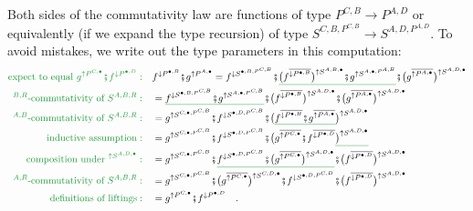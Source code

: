 Both sides of the commutativity law are functions of type $P^{C,B}\rightarrow P^{A,D}$
or equivalently (if we expand the type recursion) of type $S^{C,B,P^{C,B}}\rightarrow S^{A,D,P^{A,D}}$.
To avoid mistakes, we write out the type parameters in this computation:
\begin{align*}
{\color{greenunder}\text{expect to equal }g^{\uparrow P^{C,\bullet}}\bef f^{\downarrow P^{\bullet,D}}:}\quad & f^{\downarrow P^{\bullet,B}}\bef g^{\uparrow P^{A,\bullet}}=f^{\downarrow S^{\bullet,B,P^{C,B}}}\bef\gunderline{\big(f^{\overline{\downarrow P^{\bullet,B}}}\big)^{\uparrow S^{A,B,\bullet}}\bef g^{\uparrow S^{A,\bullet,P^{A,B}}}}\bef\big(g^{\overline{\uparrow P^{A,\bullet}}}\big)^{\uparrow S^{A,D,\bullet}}\\
{\color{greenunder}^{B,R}\text{-commutativity of }S^{A,B,R}:}\quad & =\gunderline{f^{\downarrow S^{\bullet,B,P^{C,B}}}\bef g^{\uparrow S^{A,\bullet,P^{C,B}}}}\bef\big(f^{\overline{\downarrow P^{\bullet,B}}}\big)^{\uparrow S^{A,D,\bullet}}\bef\big(g^{\overline{\uparrow P^{A,\bullet}}}\big)^{\uparrow S^{A,D,\bullet}}\\
{\color{greenunder}^{A,B}\text{-commutativity of }S^{A,B,R}:}\quad & =g^{\uparrow S^{C,\bullet,P^{C,B}}}\bef f^{\downarrow S^{\bullet,D,P^{C,B}}}\bef\big(\gunderline{f^{\overline{\downarrow P^{\bullet,B}}}\bef g^{\overline{\uparrow P^{A,\bullet}}}}\big)^{\uparrow S^{A,D,\bullet}}\\
{\color{greenunder}\text{inductive assumption}:}\quad & =g^{\uparrow S^{C,\bullet,P^{C,B}}}\bef f^{\downarrow S^{\bullet,D,P^{C,B}}}\bef\big(g^{\overline{\uparrow P^{C,\bullet}}}\bef f^{\overline{\downarrow P^{\bullet,D}}}\gunderline{\big)^{\uparrow S^{A,D,\bullet}}}\\
{\color{greenunder}\text{composition under }^{\uparrow S^{A,D,\bullet}}:}\quad & =g^{\uparrow S^{C,\bullet,P^{C,B}}}\bef\gunderline{f^{\downarrow S^{\bullet,D,P^{C,B}}}\bef\big(g^{\overline{\uparrow P^{C,\bullet}}}\big)^{\uparrow S^{A,D,\bullet}}}\bef\big(f^{\overline{\downarrow P^{\bullet,D}}}\big)^{\uparrow S^{A,D,\bullet}}\\
{\color{greenunder}^{A,R}\text{-commutativity of }S^{A,B,R}:}\quad & =g^{\uparrow S^{C,\bullet,P^{C,B}}}\bef\big(g^{\overline{\uparrow P^{C,\bullet}}}\big)^{\uparrow S^{C,D,\bullet}}\bef f^{\downarrow S^{\bullet,D,P^{C,D}}}\bef\big(f^{\overline{\downarrow P^{\bullet,D}}}\big)^{\uparrow S^{A,D,\bullet}}\\
{\color{greenunder}\text{definitions of liftings}:}\quad & =g^{\uparrow P^{C,\bullet}}\bef f^{\downarrow P^{\bullet,D}}\quad.
\end{align*}

